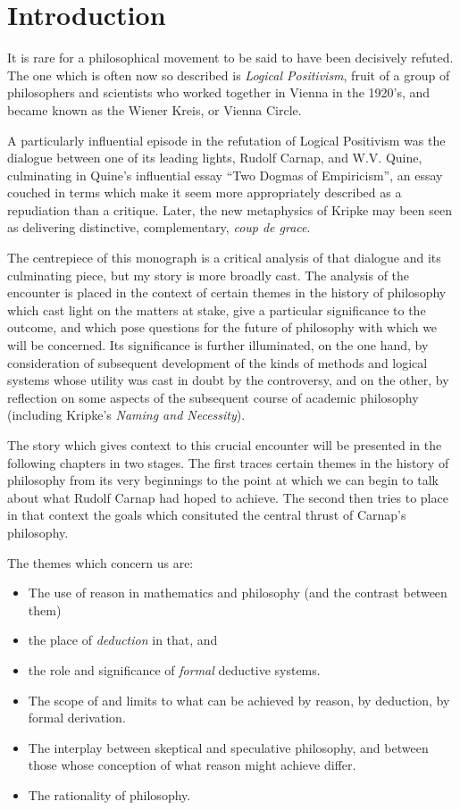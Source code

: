 \mainmatter

\chapter{Introduction}

It is rare for a philosophical movement to be said to have been decisively refuted.
The one which is often now so described is {\it Logical Positivism}, fruit of a group of philosophers and scientists who worked together in Vienna in the 1920's, and became known as the Wiener Kreis, or Vienna Circle.

A particularly influential episode in the refutation of Logical Positivism was the dialogue between one of its leading lights, Rudolf Carnap, and W.V. Quine, culminating in Quine's influential essay ``Two Dogmas of Empiricism'', an essay couched in terms which make it seem more appropriately described as a repudiation than a critique.
Later, the new metaphysics of Kripke may been seen as delivering distinctive, complementary, {\it coup de grace}.

The centrepiece of this monograph is a critical analysis of that dialogue and its culminating piece, but my story is more broadly cast.
The analysis of the encounter is placed in the context of certain themes in the history of philosophy which cast light on the matters at stake, give a particular significance to the outcome, and which pose questions for the future of philosophy with which we will be concerned.
Its significance is further illuminated, on the one hand, by consideration of subsequent development of the kinds of methods and logical systems whose utility was cast in doubt by the controversy, and on the other, by reflection on some aspects of the subsequent course of academic philosophy (including Kripke's {\it Naming and Necessity}\cite{kripke72}).

The story which gives context to this crucial encounter will be presented in the following chapters in two stages.
The first traces certain themes in the history of philosophy from its very beginnings to the point at which we can begin to talk about what Rudolf Carnap had hoped to achieve.
The second then tries to place in that context the goals which consituted the central thrust of Carnap's philosophy.

The themes which concern us are:
\begin{itemize}
\item The use of reason in mathematics and philosophy (and the contrast between them)
\item the place of {\it deduction} in that, and
\item the role and significance of {\it formal} deductive systems.
\item The scope of and limits to what can be achieved by reason, by deduction, by formal derivation.
\item The interplay between skeptical and speculative philosophy, and between those whose conception of what reason might achieve differ.
\item The rationality of philosophy.
\end{itemize}

